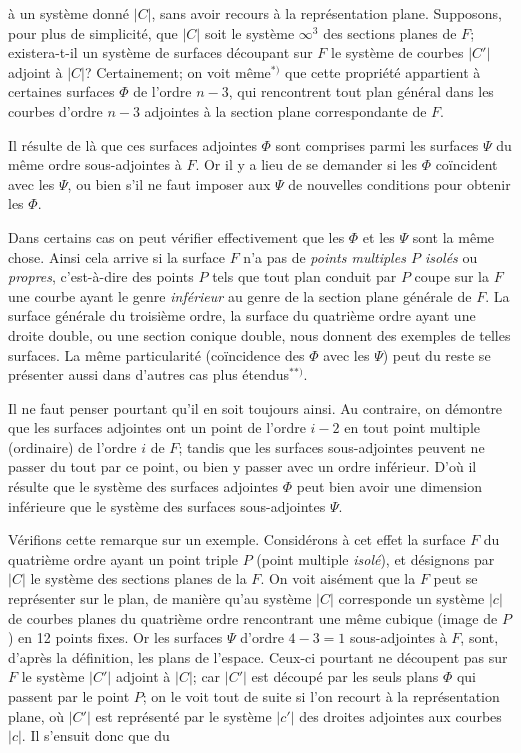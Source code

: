 \documentclass{article}
\begin{document}
à un système donné $|C|$, sans avoir recours à la représentation plane. Supposons, pour plus de simplicité, que $|C|$ soit le système $\infty^{3}$ des sections planes de $F$; existera-t-il un système de surfaces découpant sur $F$ le système de courbes $|C'|$ adjoint à $|C|$? Certainement; on voit même${}^{*)}$ que cette propriété appartient à certaines surfaces $\Phi$ de l'ordre $n-3$, qui rencontrent tout plan général dans les courbes d'ordre $n-3$ adjointes à la section plane correspondante de $F$.

Il résulte de là que ces surfaces adjointes $\Phi$ sont comprises parmi les surfaces $\Psi$ du même ordre sous-adjointes à $F$. Or il y a lieu de se demander si les $\Phi$ coïncident avec les $\Psi$, ou bien s'il ne faut imposer aux $\Psi$ de nouvelles conditions pour obtenir les $\Phi$.

Dans certains cas on peut vérifier effectivement que les $\Phi$ et les $\Psi$ sont la même chose. Ainsi cela arrive si la surface $F$ n'a pas de \emph{points multiples $P$ isolés} ou \emph{propres}, c'est-à-dire des points $P$ tels que tout plan conduit par $P$ coupe sur la $F$ une courbe ayant le genre \emph{inférieur} au genre de la section plane générale de $F$. La surface générale du troisième ordre, la surface du quatrième ordre ayant une droite double, ou une section conique double, nous donnent des exemples de telles surfaces. La même particularité (coïncidence des $\Phi$ avec les $\Psi$) peut du reste se présenter aussi dans d'autres cas plus étendus${}^{**)}$.

Il ne faut penser pourtant qu'il en soit toujours ainsi. Au contraire, on démontre que les surfaces adjointes ont un point de l'ordre $i-2$ en tout point multiple (ordinaire) de l'ordre $i$ de $F$; tandis que les surfaces sous-adjointes peuvent ne passer du tout par ce point, ou bien y passer avec un ordre inférieur. D'où il résulte que le système des surfaces adjointes $\Phi$ peut bien avoir une dimension inférieure que le système des surfaces sous-adjointes $\Psi$.

Vérifions cette remarque sur un exemple. Considérons à cet effet la surface $F$ du quatrième ordre ayant un point triple $P$ (point multiple \emph{isolé}), et désignons par $|C|$ le système des sections planes de la $F$. On voit aisément que la $F$ peut se représenter sur le plan, de manière qu'au système $|C|$ corresponde un système $|c|$ de courbes planes du quatrième ordre rencontrant une même cubique (image de $P$) en 12 points fixes. Or les surfaces $\Psi$ d'ordre $4-3=1$ sous-adjointes à $F$, sont, d'après la définition, les plans de l'espace. Ceux-ci pourtant ne découpent pas sur $F$ le système $|C'|$ adjoint à $|C|$; car $|C'|$ est découpé par les seuls plans $\Phi$ qui passent par le point $P$; on le voit tout de suite si l'on recourt à la représentation plane, où $|C'|$ est représenté par le système $|c'|$ des droites adjointes aux courbes $|c|$. Il s'ensuit donc que du
\end{document}
